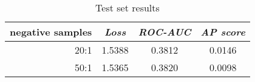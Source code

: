 \begin{table}[ht]
  \centering
  \caption{Test set results}
  \begin{tabular}{@{}r|ccc@{}}
    \toprule
    \textbf{negative samples} & \emph{Loss} & \emph{ROC-AUC} & \emph{AP score} \\ 
    \midrule
    20:1 & 1.5388 & 0.3812 & 0.0146 \\ 
    50:1 & 1.5365 & 0.3820 & 0.0098 \\ 
    \bottomrule
  \end{tabular}
  \label{tab:test_results}
\end{table}
